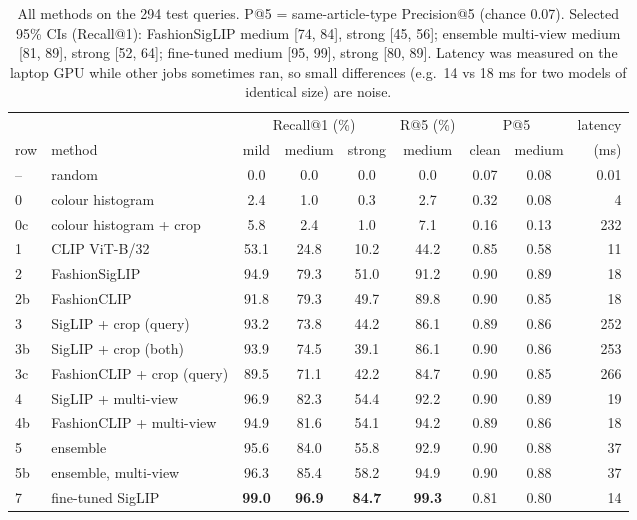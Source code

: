 \documentclass[11pt,a4paper]{article}
\begin{document}
\begin{table}[H]
\centering
\small
\begin{tabular}{llccccccr}
\toprule
& & \multicolumn{3}{c}{Recall@1 (\%)} & R@5 (\%) & \multicolumn{2}{c}{P@5} & latency \\
\cmidrule(lr){3-5}\cmidrule(lr){7-8}
row & method & mild & medium & strong & medium & clean & medium & (ms) \\
\midrule
--  & random                     & 0.0  & 0.0  & 0.0  & 0.0  & 0.07 & 0.08 & 0.01 \\
0   & colour histogram           & 2.4  & 1.0  & 0.3  & 2.7  & 0.32 & 0.08 & 4 \\
0c  & colour histogram + crop    & 5.8  & 2.4  & 1.0  & 7.1  & 0.16 & 0.13 & 232 \\
1   & CLIP ViT-B/32              & 53.1 & 24.8 & 10.2 & 44.2 & 0.85 & 0.58 & 11 \\
2   & FashionSigLIP              & 94.9 & 79.3 & 51.0 & 91.2 & 0.90 & 0.89 & 18 \\
2b  & FashionCLIP                & 91.8 & 79.3 & 49.7 & 89.8 & 0.90 & 0.85 & 18 \\
3   & SigLIP + crop (query)      & 93.2 & 73.8 & 44.2 & 86.1 & 0.89 & 0.86 & 252 \\
3b  & SigLIP + crop (both)       & 93.9 & 74.5 & 39.1 & 86.1 & 0.90 & 0.86 & 253 \\
3c  & FashionCLIP + crop (query) & 89.5 & 71.1 & 42.2 & 84.7 & 0.90 & 0.85 & 266 \\
4   & SigLIP + multi-view        & 96.9 & 82.3 & 54.4 & 92.2 & 0.90 & 0.89 & 19 \\
4b  & FashionCLIP + multi-view   & 94.9 & 81.6 & 54.1 & 94.2 & 0.89 & 0.86 & 18 \\
5   & ensemble                   & 95.6 & 84.0 & 55.8 & 92.9 & 0.90 & 0.88 & 37 \\
5b  & ensemble, multi-view       & 96.3 & 85.4 & 58.2 & 94.9 & 0.90 & 0.88 & 37 \\
7   & fine-tuned SigLIP          & \textbf{99.0} & \textbf{96.9} & \textbf{84.7} & \textbf{99.3} & 0.81 & 0.80 & 14 \\
\bottomrule
\end{tabular}
\caption{All methods on the 294 test queries. P@5 = same-article-type Precision@5 (chance 0.07).
Selected 95\% CIs (Recall@1): FashionSigLIP medium [74, 84], strong [45, 56];
ensemble multi-view medium [81, 89], strong [52, 64]; fine-tuned medium [95, 99], strong [80, 89].
Latency was measured on the laptop GPU while other jobs sometimes ran, so small differences
(e.g.\ 14 vs 18 ms for two models of identical size) are noise.}
\label{tab:ladder}
\end{table}
\end{document}

